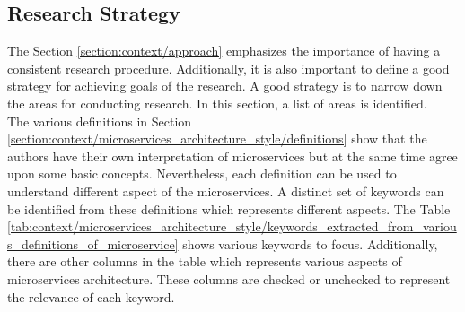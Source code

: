 \begin{enumerate}
\section{Research Strategy}\label{section:context/research_strategy}
The Section \ref{section:context/approach} emphasizes the importance of having a consistent research procedure. Additionally, it is also important to define a good strategy for achieving goals of the research. A good strategy is to narrow down the areas for conducting research. In this section, a list of areas is identified.\\
The various definitions in Section \ref{section:context/microservices_architecture_style/definitions} show that the authors have their own interpretation of microservices but at the same time agree upon some basic concepts. Nevertheless, each definition can be used to understand different aspect of the microservices. A distinct set of keywords can be identified from these definitions which represents different aspects. The Table \ref{tab:context/microservices_architecture_style/keywords_extracted_from_various_definitions_of_microservice} shows various keywords to focus. Additionally, there are other columns in the table which represents various aspects of microservices architecture. These columns are checked or unchecked to represent the relevance of each keyword. 


\end{enumerate}
